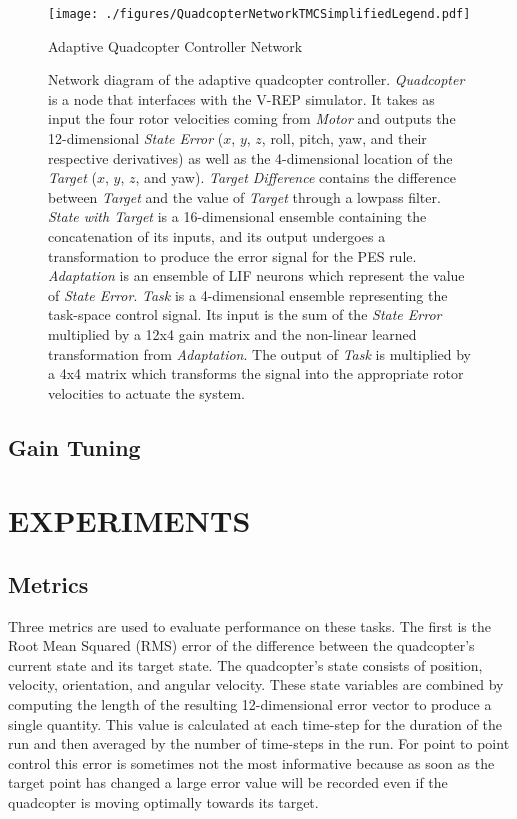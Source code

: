 \documentclass[letterpaper, 10 pt, conference]{ieeeconf}  %
\begin{document}
\begin{figure}
\centering
\texttt{[image: ./figures/QuadcopterNetworkTMCSimplifiedLegend.pdf]} %
\caption{Adaptive Quadcopter Controller Network}
\label{fig:NetFinal}
\captionsetup{singlelinecheck=off,font=footnotesize}
\caption*{Network diagram of the adaptive quadcopter controller. \textit{Quadcopter} is a node that interfaces with the V-REP simulator. It takes as input the four rotor velocities coming from \textit{Motor} and outputs the 12-dimensional \textit{State Error} ($x$, $y$, $z$, roll, pitch, yaw, and their respective derivatives) as well as the 4-dimensional location of the \textit{Target} ($x$, $y$, $z$, and yaw). \textit{Target Difference} contains the difference between \textit{Target} and the value of \textit{Target} through a lowpass filter. \textit{State with Target} is a 16-dimensional ensemble containing the concatenation of its inputs, and its output undergoes a transformation to produce the error signal for the PES rule. \textit{Adaptation} is an ensemble of LIF neurons which represent the value of \textit{State Error}. \textit{Task} is a 4-dimensional ensemble representing the task-space control signal. Its input is the sum of the \textit{State Error} multiplied by a 12x4 gain matrix and the non-linear learned transformation from \textit{Adaptation}. The output of \textit{Task} is multiplied by a 4x4 matrix which transforms the signal into the appropriate rotor velocities to actuate the system.}
\end{figure}

\subsection{Gain Tuning}



\section{EXPERIMENTS}


\subsection{Metrics}

Three metrics are used to evaluate performance on these tasks. 
The first is the Root Mean Squared (RMS) error of the difference between the quadcopter's current state and its target state.
The quadcopter's state consists of position, velocity, orientation, and angular velocity.
These state variables are combined by computing the length of the resulting 12-dimensional error vector to produce a single quantity.
This value is calculated at each time-step for the duration of the run and then averaged by the number of time-steps in the run.
For point to point control this error is sometimes not the most informative because as soon as the target point has changed a large error value will be recorded even if the quadcopter is moving optimally towards its target.
\end{document}
